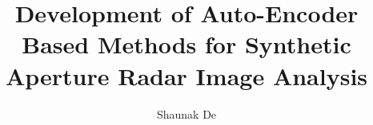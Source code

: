 \documentclass[ 14pt,a4paper,twoside,chapterprefix=on,draft]{scrbook}
\begin{document}
\title{Development of Auto-Encoder Based Methods for Synthetic Aperture Radar Image Analysis}

\author{Shaunak De}
\date{}

\maketitle  

 



%
\end{document}
